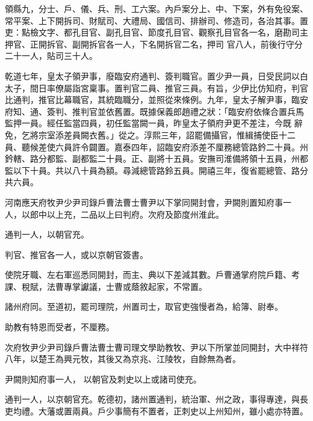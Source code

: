 \begin{pinyinscope}
 領縣九，分士、戶、儀、兵、刑、工六案。內戶案分上、中、下案，外有免役案、常平案、上下開拆司、財賦司、大禮局、國信司、排辦司、修造司，各治其事。置吏：點檢文字、都孔目官、副孔目官、節度孔目官、觀察孔目官各一名，磨勘司主押官、正開拆官、副開拆官各一人，下名開拆官二名，押司
 官八人，前後行守分二十一人，貼司三十人。



 乾道七年，皇太子領尹事，廢臨安府通判、簽判職官。置少尹一員，日受民詞以白太子，間日率僚屬詣宮稟事。置判官二員、推官三員。有旨，少伊比仿知府，判官比通判，推官比幕職官，其統臨職分，並照從來條例。九年，皇太子解尹事，臨安府知、通、簽判、推判官並依舊置。既據保義郎趙禮之狀：「臨安府依條合置兵馬監押一員。經任監當四員，初任監當闕一員，昨皇太子領府尹更不差注，今既
 辭免，乞將宗室添差員闕衣舊。」從之。淳熙三年，詔罷備攝官，惟緝捕使臣十二員、聽候差使六員許令闢置。嘉泰四年，詔臨安府添差不厘務總管路鈐二十員。州鈐轄、路分都監、副都監二十員。正、副將十五員。安撫司淮備將領十五員，州都監以下十員。共以八十員為額。尋減總管路鈴五員。開禧三年，復省罷總管、路分共六員。



 河南應天府牧尹少尹司錄戶曹法曹士曹尹以下掌同開封會，尹闕則置知府事一
 人，以郎中以上充，二品以上曰判府。次府及節度州淮此。



 通判一人，以朝官充。



 判官、推官各一人，或以京朝官簽書。



 使院牙職、左右軍巡悉同開封，而主、典以下差減其數。戶曹通掌府院戶籍、考課、稅賦，法曹專掌讞議，士曹或蔭敘起家，不常置。



 諸州府同。至道初，罷司理院，州置司士，取官吏強慢者為，給簿、尉奉。



 助教有特恩而受者，不厘務。



 次府牧尹少尹司錄戶曹法曹士曹司理文學助教牧、尹以下所掌並同開封，大中祥符八年，以楚王為興元牧，其後又為京兆、江陵牧，自餘無為者。



 尹闕則知府事一人，
 以朝官及刺史以上或諸司使充。



 通判一人，以京朝官充。乾德初，諸州置通判，統治軍、州之政，事得專達，與長吏均禮。大藩或置兩員。戶少事簡有不置者，正刺史以上州知州，雖小處亦特置。




\end{pinyinscope}
